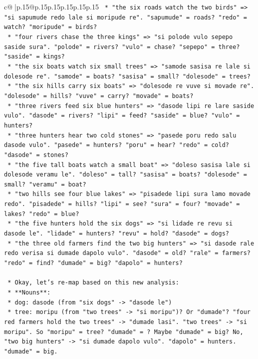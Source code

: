 \documentclass{article}
\begin{document}
{\begin{supertabular}{c@{$\;$}|p{.15\linewidth}@{}p{.15\linewidth}p{.15\linewidth}p{.15\linewidth}p{.15\linewidth}p{.15\linewidth}}
{{{\texttt{                *   "the six roads watch the two birds" => "si sapumude redo lale si moripude re". "sapumude" = roads? "redo" = watch? "moripude" = birds?} \\
\texttt{                *   "four rivers chase the three kings" => "si polode vulo sepepo saside sura". "polode" = rivers? "vulo" = chase? "sepepo" = three? "saside" = kings?} \\
\texttt{                *   "the six boats watch six small trees" => "samode sasisa re lale si dolesode re". "samode" = boats? "sasisa" = small? "dolesode" = trees?} \\
\texttt{                *   "the six hills carry six boats" => "dolesode re vuve si movade re". "dolesode" = hills? "vuve" = carry? "movade" = boats?} \\
\texttt{                *   "three rivers feed six blue hunters" => "dasode lipi re lare saside vulo". "dasode" = rivers? "lipi" = feed? "saside" = blue? "vulo" = hunters?} \\
\texttt{                *   "three hunters hear two cold stones" => "pasede poru redo salu dasode vulo". "pasede" = hunters? "poru" = hear? "redo" = cold? "dasode" = stones?} \\
\texttt{                *   "the five tall boats watch a small boat" => "doleso sasisa lale si dolesode veramu le". "doleso" = tall? "sasisa" = boats? "dolesode" = small? "veramu" = boat?} \\
\texttt{                *   "two hills see four blue lakes" => "pisadede lipi sura lamo movade redo". "pisadede" = hills? "lipi" = see? "sura" = four? "movade" = lakes? "redo" = blue?} \\
\texttt{                *   "the five hunters hold the six dogs" => "si lidade re revu si dasode le". "lidade" = hunters? "revu" = hold? "dasode" = dogs?} \\
\texttt{                *   "the three old farmers find the two big hunters" => "si dasode rale redo verisa si dumade dapolo vulo". "dasode" = old? "rale" = farmers? "redo" = find? "dumade" = big? "dapolo" = hunters?} \\
\\ 
\texttt{    *   Okay, let's re{-}map based on this new analysis:} \\
\texttt{        *   **Nouns**:} \\
\texttt{            *   dog: dasode (from "six dogs" {-}> "dasode le")} \\
\texttt{            *   tree: moripu (from "two trees" {-}> "si moripu")? Or "dumade"? "four red farmers hold the two trees" {-}> "dumade lasi". "two trees" {-}> "si moripu". So "moripu" = tree? "dumade" = ? Maybe "dumade" = big? No, "two big hunters" {-}> "si dumade dapolo vulo". "dapolo" = hunters. "dumade" = big.} \\
}}}
\end{supertabular}}
\end{document}
